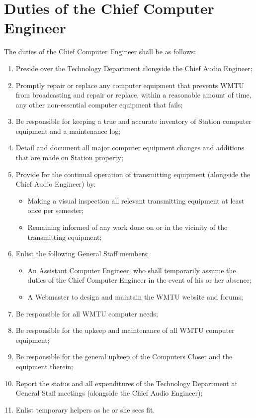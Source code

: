\documentclass[12pt]{constitution}
\begin{document}
\section{​Duties of the Chief Computer Engineer}
The duties of the Chief Computer Engineer shall be as follows:
\begin{enumerate}
\item Preside over the Technology Department alongside the Chief Audio Engineer;
\item Promptly repair or replace any computer equipment that prevents WMTU from broadcasting and repair or replace, within a reasonable amount of time, any other non-­essential computer equipment that fails;
\item Be responsible for keeping a true and accurate inventory of Station computer equipment and a maintenance log;
\item Detail and document all major computer equipment changes and additions that are made on Station property;
\item Provide for the continual operation of transmitting equipment (alongside the Chief Audio Engineer) by:
\begin{itemize}
\item Making a visual inspection all relevant transmitting equipment at least once per semester;
\item Remaining informed of any work done on or in the vicinity of the transmitting equipment;
\end{itemize}
\item Enlist the following General Staff members:
\begin{itemize}
\item An Assistant Computer Engineer, who shall temporarily assume the duties of the Chief Computer Engineer in the event of his or her absence;
\item A Webmaster to design and maintain the WMTU website and forums;
\end{itemize}
\item Be responsible for all WMTU computer needs;
\item Be responsible for the upkeep and maintenance of all WMTU computer equipment;
\item Be responsible for the general upkeep of the Computers Closet and the equipment therein;
\item Report the status and all expenditures of the Technology Department at General Staff meetings (alongside the Chief Audio Engineer);
\item Enlist temporary helpers as he or she sees fit.
\end{enumerate}
\end{document}
